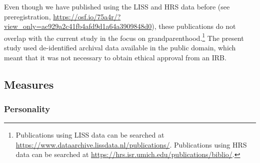 \documentclass[
  english,
  man,floatsintext]{apa7}
\begin{document}
Even though we have published using the LISS and HRS data before (see preregistration, \url{https://osf.io/75a4r/?view_only=ac929a2c41fb4afd9d1a64a3909848d0}), these publications do not overlap with the current study in the focus on grandparenthood.\footnote{Publications using LISS data can be searched at \url{https://www.dataarchive.lissdata.nl/publications/}. Publications using HRS data can be searched at \url{https://hrs.isr.umich.edu/publications/biblio/}.} The present study used de-identified archival data available in the public domain, which meant that it was not necessary to obtain ethical approval from an IRB.

\hypertarget{measures}{%
\subsection{Measures}\label{measures}}

\hypertarget{personality}{%
\subsubsection{Personality}\label{personality}}
\end{document}
